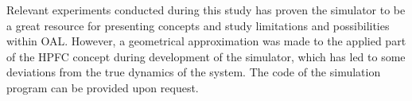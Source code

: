 Relevant experiments conducted during this study has proven the simulator to be a great resource for presenting concepts and study limitations and possibilities within OAL. However, a geometrical approximation was made to the applied part of the HPFC concept during development of the simulator, which has led to some deviations from the true dynamics of the system. The code of the simulation program can be provided upon request.


\makeatletter
{}


\makeatother







